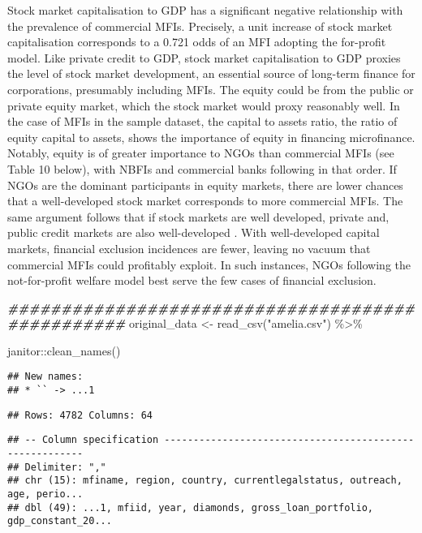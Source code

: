 \documentclass[a4paper,nobind]{templates/ociamthesis}
\newenvironment{Shaded}{\begin{snugshade}}{\end{snugshade}}
\newcommand{\DocumentationTok}[1]{\textcolor[rgb]{0.56,0.35,0.01}{\textbf{\textit{#1}}}}
\newcommand{\FunctionTok}[1]{\textcolor[rgb]{0.00,0.00,0.00}{#1}}
\newcommand{\NormalTok}[1]{#1}
\newcommand{\OtherTok}[1]{\textcolor[rgb]{0.56,0.35,0.01}{#1}}
\newcommand{\SpecialCharTok}[1]{\textcolor[rgb]{0.00,0.00,0.00}{#1}}
\newcommand{\StringTok}[1]{\textcolor[rgb]{0.31,0.60,0.02}{#1}}
\renewenvironment{Shaded}
{
  \vspace{10pt}%
  \begin{snugshade}%
}{%
  \end{snugshade}%
  \vspace{8pt}%
}
\begin{document}
Stock market capitalisation to GDP has a significant negative relationship with the prevalence of commercial MFIs. Precisely, a unit increase of stock market capitalisation corresponds to a 0.721 odds of an MFI adopting the for-profit model. Like private credit to GDP, stock market capitalisation to GDP proxies the level of stock market development, an essential source of long-term finance for corporations, presumably including MFIs. The equity could be from the public or private equity market, which the stock market would proxy reasonably well. In the case of MFIs in the sample dataset, the capital to assets ratio, the ratio of equity capital to assets, shows the importance of equity in financing microfinance. Notably, equity is of greater importance to NGOs than commercial MFIs (see Table 10 below), with NBFIs and commercial banks following in that order. If NGOs are the dominant participants in equity markets, there are lower chances that a well-developed stock market corresponds to more commercial MFIs. The same argument follows that if stock markets are well developed, private and, public credit markets are also well-developed \autocite{schnyder2018twenty}. With well-developed capital markets, financial exclusion incidences are fewer, leaving no vacuum that commercial MFIs could profitably exploit. In such instances, NGOs following the not-for-profit welfare model best serve the few cases of financial exclusion.

\begin{Shaded}
\begin{Highlighting}[]
\DocumentationTok{\#\#\#\#\#\#\#\#\#\#\#\#\#\#\#\#\#\#\#\#\#\#\#\#\#\#\#\#\#\#\#\#\#\#\#\#\#\#\#\#\#\#\#\#\#\#\#\#\#}
\NormalTok{original\_data }\OtherTok{\textless{}{-}} \FunctionTok{read\_csv}\NormalTok{(}\StringTok{"amelia.csv"}\NormalTok{) }\SpecialCharTok{\%\textgreater{}\%} 
  
\NormalTok{  janitor}\SpecialCharTok{::}\FunctionTok{clean\_names}\NormalTok{() }
\end{Highlighting}
\end{Shaded}

\begin{verbatim}
## New names:
## * `` -> ...1
\end{verbatim}

\begin{verbatim}
## Rows: 4782 Columns: 64
\end{verbatim}

\begin{verbatim}
## -- Column specification --------------------------------------------------------
## Delimiter: ","
## chr (15): mfiname, region, country, currentlegalstatus, outreach, age, perio...
## dbl (49): ...1, mfiid, year, diamonds, gross_loan_portfolio, gdp_constant_20...
\end{verbatim}
\end{document}
